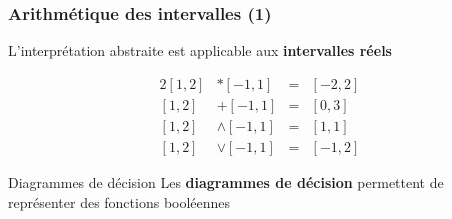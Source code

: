 \documentclass[french, 12pt]{beamer}
\begin{document}
\begin{frame}
    \frametitle{Arithmétique des intervalles (1)}

    L'interprétation abstraite est applicable aux \textbf{intervalles réels}

    \begin{alignat*}{2}
    [1, 2] &* [-1, 1] &=& [-2, 2] \\
    [1, 2] &+ [-1, 1] &=& [0, 3] \\
    [1, 2] &\land [-1, 1] &=& [1, 1] \\
    [1, 2] &\lor [-1, 1] &=& [-1, 2]
    \end{alignat*}
\end{frame}

\begin{frame}{Diagrammes de décision}
    Les \textbf{diagrammes de décision} permettent de représenter des fonctions booléennes

\vspace{1em}
\end{frame}
\end{document}
